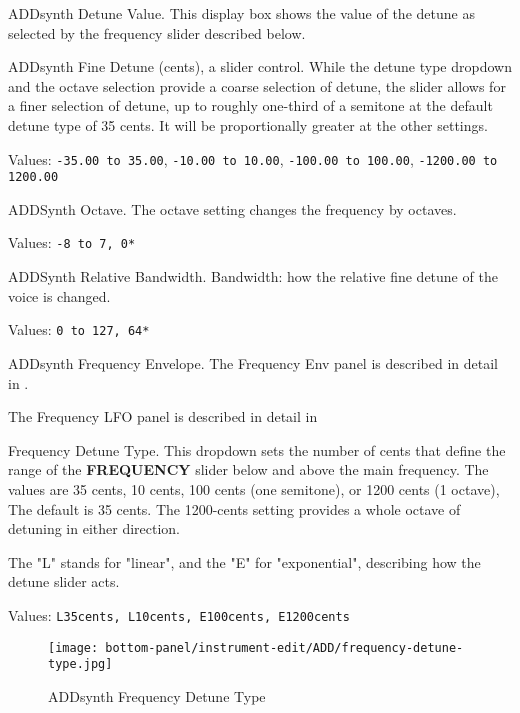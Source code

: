    \setcounter{ItemCounter}{0}      %

   ADDsynth Detune Value.
   This display box shows the value of the detune as selected by the
   frequency slider described below.

   ADDsynth Fine Detune (cents), a slider control.
   While the detune type dropdown and the octave selection provide a coarse
   selection of detune, the slider allows for a finer selection of detune,
   up to roughly one-third of a semitone at the default detune type of 35
   cents. It will be proportionally greater at the other settings.

   Values:
      \texttt{-35.00 to 35.00},
      \texttt{-10.00 to 10.00},
      \texttt{-100.00 to 100.00},
      \texttt{-1200.00 to 1200.00}

   ADDSynth Octave.
   The octave setting changes the frequency by octaves.

   Values: \texttt{-8 to 7, 0*}

   ADDSynth Relative Bandwidth.
   Bandwidth: how the relative fine detune of the voice is changed.

   Values: \texttt{0 to 127, 64*}

   ADDsynth Frequency Envelope.
   The Frequency Env panel is described in detail in
   .

   The Frequency LFO panel is described in detail in

   Frequency Detune Type.
   This dropdown sets the number of cents that define the range of the
   \textbf{FREQUENCY} slider below and above the main frequency.
   The values are 35 cents, 10 cents, 100 cents (one semitone), or
   1200 cents (1 octave),  The default is 35 cents.  The 1200-cents
   setting provides a whole octave of detuning in either direction.

   The "L" stands for "linear", and the "E" for "exponential", describing
   how the detune slider acts.

   Values: \texttt{L35cents, L10cents, E100cents, E1200cents}

   \begin{figure}[H]
   \centering
   \texttt{[image: bottom-panel/instrument-edit/ADD/frequency-detune-type.jpg]}
   \caption{ADDsynth Frequency Detune Type}
   \label{fig:addsynth_freq_detune_type}
\end{figure}

